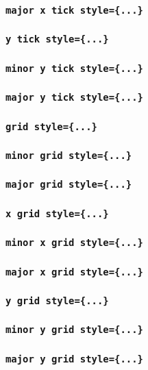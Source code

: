 \subsubsection{\texttt{major x tick style=\{...\}}}
\subsubsection{\texttt{y tick style=\{...\}}}
\subsubsection{\texttt{minor y tick style=\{...\}}}
\subsubsection{\texttt{major y tick style=\{...\}}}
\subsubsection{\texttt{grid style=\{...\}}}
\subsubsection{\texttt{minor grid style=\{...\}}}
\subsubsection{\texttt{major grid style=\{...\}}}
\subsubsection{\texttt{x grid style=\{...\}}}
\subsubsection{\texttt{minor x grid style=\{...\}}}
\subsubsection{\texttt{major x grid style=\{...\}}}
\subsubsection{\texttt{y grid style=\{...\}}}
\subsubsection{\texttt{minor y grid style=\{...\}}}
\subsubsection{\texttt{major y grid style=\{...\}}}
